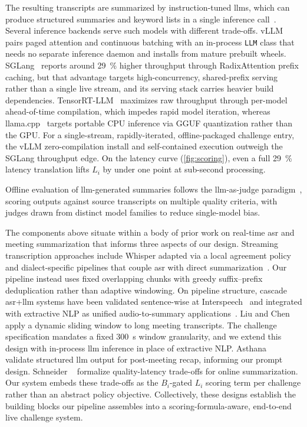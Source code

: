 \documentclass[conference,letterpaper]{IEEEtran}
\begin{document}
The resulting transcripts are summarized by instruction-tuned \glspl{llm}, which can produce structured summaries and keyword lists in a single inference call~\cite{qwen3}.
Several inference backends serve such models with different trade-offs.
vLLM~\cite{vllm} pairs paged attention and continuous batching with an in-process \texttt{LLM} class that needs no separate inference daemon and installs from mature prebuilt wheels.
SGLang~\cite{sglang} reports around \SI{29}{\percent} higher throughput through RadixAttention prefix caching, but that advantage targets high-concurrency, shared-prefix serving rather than a single live stream, and its serving stack carries heavier build dependencies.
TensorRT-LLM~\cite{tensor-rt-llm} maximizes raw throughput through per-model ahead-of-time compilation, which impedes rapid model iteration, whereas llama.cpp~\cite{llamacpp} targets portable CPU inference via GGUF quantization rather than the GPU.
For a single-stream, rapidly-iterated, offline-packaged challenge entry, the vLLM zero-compilation install and self-contained execution outweigh the SGLang throughput edge.
On the latency curve (\cref{fig:scoring}), even a full \SI{29}{\percent} latency translation lifts $L_i$ by under one point at sub-second processing.

Offline evaluation of \gls{llm}-generated summaries follows the \gls{llm}-as-judge paradigm~\cite{geval}, scoring outputs against source transcripts on multiple quality criteria, with judges drawn from distinct model families to reduce single-model bias.

The components above situate within a body of prior work on real-time \gls{asr} and meeting summarization that informs three aspects of our design.
Streaming transcription approaches include Whisper adapted via a local agreement policy~\cite{machacek2023} and dialect-specific pipelines that couple \gls{asr} with direct summarization~\cite{saranya2025}.
Our pipeline instead uses fixed overlapping chunks with greedy suffix--prefix deduplication rather than adaptive windowing.
On pipeline structure, cascade \gls{asr}+\gls{llm} systems have been validated sentence-wise at Interspeech~\cite{matsuura2024} and integrated with extractive NLP as unified audio-to-summary applications~\cite{whispersum2024}.
Liu and Chen~\cite{liu2021sliding} apply a dynamic sliding window to long meeting transcripts.
The challenge specification mandates a fixed \SI{300}{\second} window granularity, and we extend this design with in-process \gls{llm} inference in place of extractive NLP.
Asthana \etal~\cite{asthana2024} validate structured \gls{llm} output for post-meeting recap, informing our prompt design.
Schneider \etal~\cite{schneider2025} formalize quality-latency trade-offs for online summarization.
Our system embeds these trade-offs as the $B_i$-gated $L_i$ scoring term per challenge rather than an abstract policy objective.
Collectively, these designs establish the building blocks our pipeline assembles into a scoring-formula-aware, end-to-end live challenge system.
\end{document}
